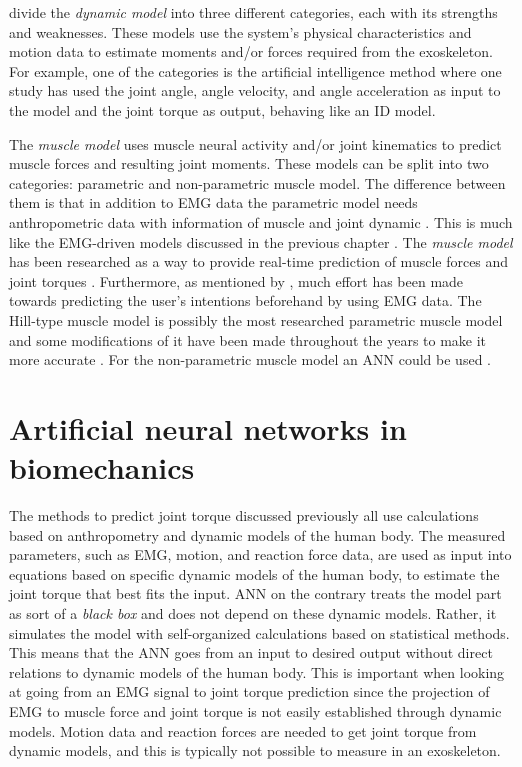 \documentclass[../main.tex]{subfiles}
\begin{document}
\textcite{Anam2012} divide the \textit{dynamic model} into three different categories, each with its strengths and weaknesses.
These models use the system's physical characteristics and motion data to estimate moments and/or forces required from the exoskeleton. 
For example, one of the categories is the artificial intelligence method where one study has used the joint angle, angle velocity, and angle acceleration as input to the model and the joint torque as output, behaving like an \ac{ID} model.

The \textit{muscle model} uses muscle neural activity and/or joint kinematics to predict muscle forces and resulting joint moments. 
These models can be split into two categories: parametric and non-parametric muscle model. 
The difference between them is that in addition to \ac{EMG} data the parametric model needs anthropometric data with information of muscle and joint dynamic \cite{Anam2012}.
This is much like the \ac{EMG}-driven models discussed in the previous chapter \cite{Pizzolato2015}.
The \textit{muscle model} has been researched as a way to provide real-time prediction of muscle forces and joint torques \cite{Pizzolato2015, Anam2012, durandau}. 
Furthermore, as mentioned by \textcite{Anam2012}, much effort has been made towards predicting the user's intentions beforehand by using \ac{EMG} data.
The Hill-type muscle model is possibly the most researched parametric muscle model and some modifications of it have been made throughout the years to make it more accurate \cite{Pizzolato2015, Lloyd2003, Anam2012, Lee14-1}.
For the non-parametric muscle model an \ac{ANN} could be used \cite{Lee14-1, Kiguchi2012}.  

\section{Artificial neural networks in biomechanics}
The methods to predict joint torque discussed previously all use calculations based on anthropometry and dynamic models of the human body. 
The measured parameters, such as \ac{EMG}, motion, and reaction force data, are used as input into equations based on specific dynamic models of the human body, to estimate the joint torque that best fits the input.
\Ac{ANN} on the contrary treats the model part as sort of a \textit{black box} and does not depend on these dynamic models. 
Rather, it simulates the model with self-organized calculations based on statistical methods.
This means that the \ac{ANN} goes from an input to desired output without direct relations to dynamic models of the human body.
This is important when looking at going from an \ac{EMG} signal to joint torque prediction since the projection of \ac{EMG} to muscle force and joint torque is not easily established through dynamic models.
Motion data and reaction forces are needed to get joint torque from dynamic models, and this is typically not possible to measure in an exoskeleton.
\end{document}
